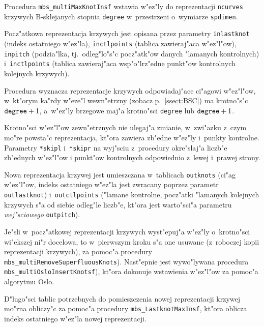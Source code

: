 \vspace{\bigskipamount}
\begin{sloppypar}
Procedura \texttt{mbs\_multiMaxKnotInsf} wstawia w"ez"ly do reprezentacji
\texttt{ncurves} krzywych B-sklejanych stopnia \texttt{degree}
w~przestrzeni o~wymiarze \texttt{spdimen}.

Pocz"atkowa reprezentacja
krzywych jest opisana przez parametry \texttt{inlastknot} (indeks ostatniego
w"ez"la), \texttt{inctlpoints} (tablica zawieraj"aca w"ez"l"ow),
\texttt{inpitch} (podzia"lka, tj.\ odleg"lo"s"c pocz"atk"ow danych "lamanych
kontrolnych) i~\texttt{inctlpoints} (tab\-li\-ca zawieraj"aca wsp"o"lrz"edne
punkt"ow kontrolnych kolejnych krzywych).

Procedura wyznacza reprezentacje krzywych odpowiadaj"ace ci"agowi w"ez"l"ow,
w~kt"orym ka"rdy w"eze"l wewn"etrzny (zobacz p.~\ref{ssect:BSC}) ma krotno"s"c
$\mathord{\makebox{\texttt{degree}}}+1$, a~w"ez"ly brzegowe maj"a krotno"sci
\texttt{degree} lub $\mathord{\makebox{\texttt{degree}}}+1$.

Krotno"sci w"ez"l"ow zewn"etrznych nie ulegaj"a zmianie, w~zwi"azku z~czym
mo"re powsta"c reprezentacja, kt"ora zawiera zb"edne w"ez"ly i~punkty
kontrolne. Parametry \texttt{*skipl} i~\texttt{*skipr} na wyj"sciu
z~procedury okre"slaj"a liczb"e zb"ednych w"ez"l"ow i punkt"ow
kontrolnych odpowiednio z~lewej i~prawej strony.

Nowa reprezentacja krzywej jest umieszczana w~tablicach
\texttt{outknots} (ci"ag w"ez\-"l"ow, indeks ostatniego w"ez"la jest zwracany
poprzez parametr \texttt{outlastknot}) i~\texttt{outctlpoints} ("lamane
kontrolne, pocz"atki "lamanych kolejnych krzywych s"a od siebie odleg"le
liczb"e, kt"ora jest warto"sci"a parametru \emph{wej"sciowego}
\texttt{outpitch}).

Je"sli w~pocz"atkowej reprezentacji krzywych wyst"epuj"a w"ez"ly
o~krotno"sci wi"ekszej ni"r docelowa, to w~pierwszym kroku s"a one
usuwane (z~roboczej kopii reprezentacji krzywych), za pomoc"a procedury
\texttt{mbs\_multiRemoveSuperfluousKnots}).
Nast"epnie jest wywo"lywana procedura \texttt{mbs\_multiOsloInsertKnotsf}),
kt"ora dokonuje wstawienia w"ez"l"ow za pomoc"a algorytmu Oslo.

D"lugo"sci tablic potrzebnych do pomieszczenia nowej reprezentacji krzywej
mo"rna obliczy"c za pomoc"a procedury \texttt{mbs\_LastknotMaxInsf}, kt"ora
oblicza indeks ostatniego w"ez"la nowej reprezentacji.
\end{sloppypar}


